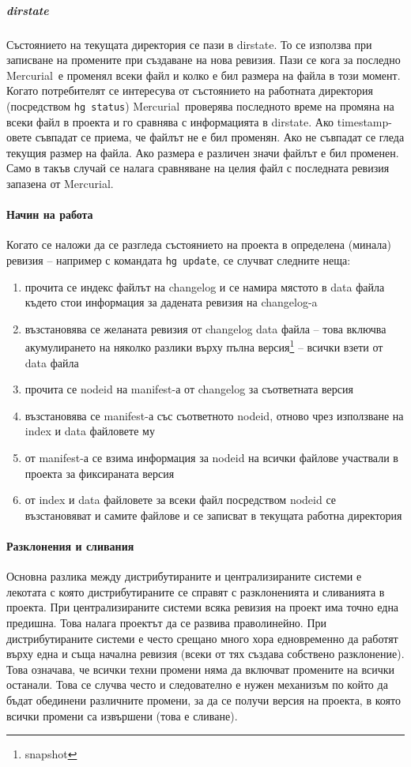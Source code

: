 \documentclass[a4paper]{article}
\def\Hg{Mercurial}
\begin{document}
    \subparagraph{dirstate} Състоянието на текущата директория се пази
    в dirstate. То се използва при записване на промените при създаване на нова
    ревизия. Пази се кога за последно \Hg\ е променял всеки файл и колко е бил
    размера на файла в този момент. Когато потребителят се интересува от
    състоянието на работната директория (посредством \texttt{hg status}) \Hg\
    проверява последното време на промяна на всеки файл в проекта и го сравнява
    с информацията в dirstate.  Ако timestamp-овете съвпадат се приема, че
    файлът не е бил променян. Ако не съвпадат се гледа текущия размер на файла.
    Ако размера е различен значи файлът е бил променен. Само в такъв случай се
    налага сравняване на целия файл с последната ревизия запазена от \Hg.

    \paragraph{Начин на работа}
    Когато се наложи да се разгледа състоянието на проекта в определена
    (минала) ревизия -- например с командата \texttt{hg update}, се
    случват следните неща:
    \begin{enumerate}
      \item прочита се индекс файлът на changelog и се намира мястото в data
      файла където стои информация за дадената ревизия на changelog-a
      \item възстановява се желаната ревизия от changelog data файла -- това
      включва акумулирането на няколко разлики върху пълна
      версия\footnote{snapshot} -- всички взети от data файла
      \item прочита се nodeid на manifest-а от changelog за съответната версия
      \item възстановява се manifest-а със съответното nodeid, отново чрез
      използване на index и data файловете му
      \item от manifest-а се взима информация за nodeid на всички файлове
      участвали в проекта за фиксираната версия
      \item от index и data файловете за всеки файл посредством nodeid се
      възстановяват и самите файлове и се записват в текущата работна
      директория
    \end{enumerate}

    \paragraph{Разклонения и сливания}
    Основна разлика между дистрибутираните и централизираните системи
    е лекотата с която дистрибутираните се справят с разклоненията и сливанията
    в проекта. При централизираните системи всяка ревизия на проект има точно
    една предишна. Това налага проектът да се развива праволинейно. При
    дистрибутираните системи е често срещано много хора едновременно да работят
    върху една и съща начална ревизия (всеки от тях създава собствено
    разклонение). Това означава, че всички техни промени няма да включват
    промените на всички останали. Това се случва често и следователно е нужен
    механизъм по който да бъдат обединени различните промени, за да се получи
    версия на проекта, в която всички промени са извършени (това е сливане).
\end{document}

